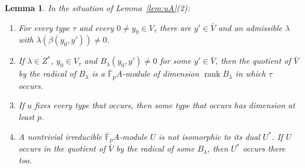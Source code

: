 \documentclass[11pt]{amsart}
\newtheorem{lemma}[theorem]{Lemma}
\theoremstyle{definition}
\theoremstyle{remark}
\newcommand{\F}{\mathbb{F}}
\newcommand{\rank}{\operatorname{rank}}
\newcommand{\Kb}{\overline{\F}_p}
\begin{document}
\begin{lemma}\label{lem:types}
In the situation of Lemma~\ref{lem:uA}(2):
\begin{enumerate}
\item For every type $\tau$ and every $0\ne y_0\in V_\tau$ there are $y'\in\bar V$ and an admissible $\lambda$ with $\lambda(\beta(y_0,y'))\ne0$.
\item If $\lambda\in Z^*$, $y_0\in V_\tau$ and $B_\lambda(y_0,y')\ne0$ for some $y'\in\bar V$, then the quotient of $\bar V$ by the radical of $B_\lambda$ is a $\Kb A$-module of dimension $\rank B_\lambda$ in which $\tau$ occurs.
\item If $u$ fixes every type that occurs, then some type that occurs has dimension at least $p$.
\item A nontrivial irreducible $\Kb A$-module $U$ is not isomorphic to its dual $U^*$. If $U$ occurs in the quotient of $\bar V$ by the radical of some $B_\lambda$, then $U^*$ occurs there too.
\end{enumerate}
\end{lemma}
\end{document}
